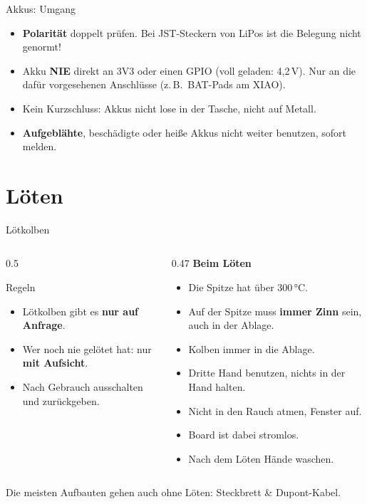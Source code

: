 \documentclass[10pt]{beamer}
\newcommand{\never}{\textcolor{fsitred}{\textbf{NIE}}\xspace}
\newcommand{\warn}{\item[\textcolor{fsitred}{\faWarning}]}
\begin{document}
\begin{frame}{Akkus: Umgang}
  \begin{itemize}
    \warn \textbf{Polarität} doppelt prüfen. Bei JST-Steckern von LiPos ist
          die Belegung nicht genormt!
    \warn Akku \never direkt an 3V3 oder einen GPIO (voll geladen: 4,2\,V).
          Nur an die dafür vorgesehenen Anschlüsse (z.\,B.\ BAT-Pads am XIAO).
    \warn Kein Kurzschluss: Akkus nicht lose in der Tasche, nicht auf Metall.
    \warn \textbf{Aufgeblähte}, beschädigte oder heiße Akkus nicht weiter benutzen,
          sofort melden.
  \end{itemize}
\end{frame}

\section{Löten}

\begin{frame}{Lötkolben}
  \begin{columns}[T]
    \begin{column}{0.5\textwidth}
      \begin{alertblock}{Regeln}
        \begin{itemize}
          \item Lötkolben gibt es \textbf{nur auf Anfrage}.
          \item Wer noch nie gelötet hat: nur \textbf{mit Aufsicht}.
          \item Nach Gebrauch ausschalten und zurückgeben.
        \end{itemize}
      \end{alertblock}
    \end{column}
    \begin{column}{0.47\textwidth}
      \small
      \textbf{Beim Löten}
      \begin{itemize}
        \item Die Spitze hat über 300\,°C.
        \item Auf der Spitze muss \textbf{immer Zinn} sein, auch in der Ablage.
        \item Kolben immer in die Ablage.
        \item Dritte Hand benutzen, nichts in der Hand halten.
        \item Nicht in den Rauch atmen, Fenster auf.
        \item Board ist dabei stromlos.
        \item Nach dem Löten Hände waschen.
      \end{itemize}
    \end{column}
  \end{columns}
  \vspace{0.2em}
  \small Die meisten Aufbauten gehen auch ohne Löten: Steckbrett \& Dupont-Kabel.
\end{frame}
\end{document}
